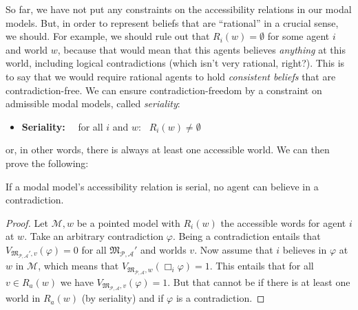 \documentclass[nobib,nofonts]{tufte-handout}
\newcommand{\Model}{\ensuremath{\mathcal{M}}}
\newcommand{\Models}{\ensuremath{\mathfrak{M}_{\mathcal{P},\mathcal{A}}}}
\begin{document}
So far, we have not put any constraints on the accessibility relations in our modal models.
But, in order to represent beliefs that are ``rational'' in a crucial sense, we should.
For example, we should rule out that $R_{i}(w) = \emptyset$ for some agent $i$ and world $w$, because that would mean that this agents believes \emph{anything} at this world, including logical contradictions (which isn't very rational, right?).
This is to say that we would require rational agents to hold \emph{consistent beliefs} that are contradiction-free.
We can ensure contradiction-freedom by a constraint on admissible modal models, called \emph{seriality}:
\begin{itemize}[]
  \item \textbf{Seriality:} \ \  for all $i$ and $w$: \ $R_{i}(w) \neq \emptyset$
\end{itemize}
or, in other words, there is always at least one accessible world.
We can then prove the following:

\begin{claim}
  If a modal model's accessibility relation is serial, no agent can believe in a contradiction.
\end{claim}
\begin{proof}
  Let $\Model, w$ be a pointed model with $R_{i}(w)$ the accessible words for agent $i$ at $w$.
  Take an arbitrary contradiction $\varphi$.
  Being a contradiction entails that $V_{\Models', v}(\varphi) = 0$ for all $\Models'$ and worlds $v$.
  Now assume that $i$ believes in $\varphi$ at $w$ in $\Model$, which means that $V_{\Models, w}(\Box_{i}\varphi)=1$.
  This entails that for all $v \in R_{a}(w)$ we have $V_{\Models, v}(\varphi) = 1$.
  But that cannot be if there is at least one world in $R_{a}(w)$ (by seriality) and if $\varphi$ is a contradiction.
\end{proof}
\end{document}
